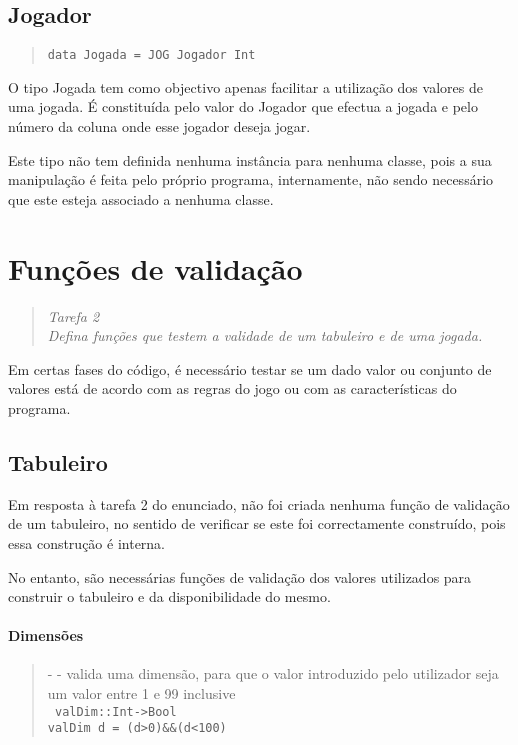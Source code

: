\documentclass[a4paper,titlepage]{scrreprt}
\begin{document}
	\section{Jogador}
		\begin{quote}
			{\tt data Jogada = JOG Jogador Int}
		\end{quote}
		O tipo Jogada tem como objectivo apenas facilitar a utilização dos valores de uma jogada. É constituída pelo valor do Jogador
		que efectua a jogada e pelo número da coluna onde esse jogador deseja jogar.
		
		Este tipo não tem definida nenhuma instância para nenhuma classe, pois a sua manipulação é feita pelo próprio programa,
		internamente, não sendo necessário que este esteja associado a nenhuma classe.
\chapter{Funções de validação}
	\begin{quote}
		\begin{center}
			{\it
			Tarefa 2\\
			Defina funções que testem a validade de um tabuleiro e de uma jogada.
			}
		\end{center}
	\end{quote}
Em certas fases do código, é necessário testar se um dado valor ou conjunto de valores está de acordo com as regras do jogo ou com as
características do programa.

	\section{Tabuleiro}
	Em resposta à tarefa 2 do enunciado, não foi criada nenhuma função de validação de um tabuleiro, no sentido de verificar se este foi
	correctamente construído, pois essa construção é interna.
	
	No entanto, são necessárias funções de validação dos valores utilizados para construir o tabuleiro e da disponibilidade do mesmo.
		\subsubsection{Dimensões}
			\begin{quote}
				{\small - - valida uma dimensão, para que o valor introduzido pelo utilizador seja um valor entre 1 e 99 inclusive\\}
				{\tt
				valDim::Int->Bool\\
				valDim d = (d>0)\&\&(d<100)
				}
			\end{quote}
\end{document}
